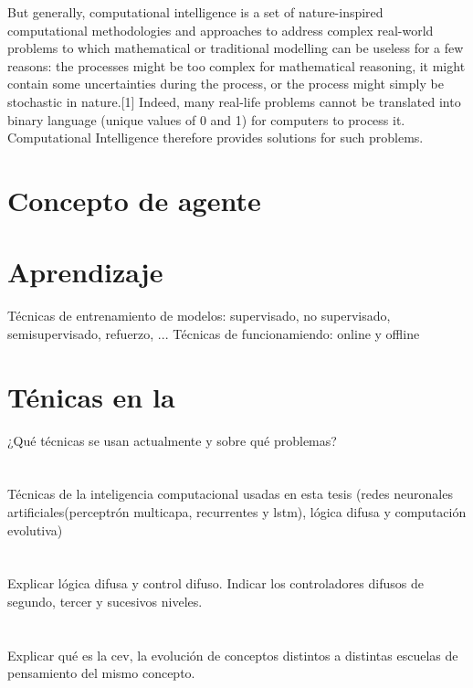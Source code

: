 But generally, computational intelligence is a set of nature-inspired computational methodologies and approaches to address complex real-world problems to which mathematical or traditional modelling can be useless for a few reasons: the processes might be too complex for mathematical reasoning, it might contain some uncertainties during the process, or the process might simply be stochastic in nature.[1] Indeed, many real-life problems cannot be translated into binary language (unique values of 0 and 1) for computers to process it. Computational Intelligence therefore provides solutions for such problems.

\section{Concepto de agente}

\section{Aprendizaje}

Técnicas de entrenamiento de modelos: supervisado, no supervisado, semisupervisado, refuerzo, ...
Técnicas de funcionamiendo: online y offline

\section{Ténicas en la }

¿Qué técnicas se usan actualmente y sobre qué problemas?

\section{}

Técnicas de la inteligencia computacional usadas en esta tesis (redes neuronales artificiales(perceptrón multicapa, recurrentes y lstm), lógica difusa y computación evolutiva)

\section{}

Explicar lógica difusa y control difuso. Indicar los controladores difusos de segundo, tercer y sucesivos niveles.

\section{}

Explicar qué es la cev, la evolución de conceptos distintos a distintas escuelas de pensamiento del mismo concepto. 